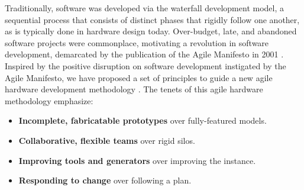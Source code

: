 Traditionally, software was developed via the waterfall development
model, a sequential process that consists of distinct phases that
rigidly follow one another, as is typically done in hardware design today.
Over-budget, late, and abandoned software projects were commonplace,
motivating a revolution in software development, demarcated by the
publication of the Agile Manifesto in 2001 \cite{agile}.
Inspired by the positive disruption on software development instigated by the Agile Manifesto,
we have proposed a set of principles to guide a new agile
hardware development methodology \cite{lee-micro15}.
The tenets of this agile hardware methodology emphasize:
\begin{itemize}
\item {\bf Incomplete, fabricatable prototypes} over fully-featured models.
\item {\bf Collaborative, flexible teams} over rigid silos.
\item {\bf Improving tools and generators} over improving the instance.
\item {\bf Responding to change} over following a plan.
\end{itemize}

